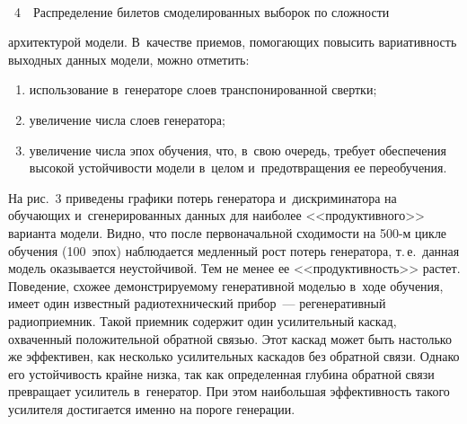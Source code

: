 \begin{multicols}{2}
\vspace*{6pt}

{ \begin{center}  %
 \vspace*{-3pt}
    \mbox{%
\epsfxsize=78.898mm 
}

\end{center}



\noindent
{{\figurename~4}\ \ \small{Распределение билетов смоделированных выборок по сложности
}}}

\vspace*{6pt}


 
 
 \noindent
  архитектурой модели. 
В~качестве приемов, помогающих повысить вариативность выходных 
данных модели, можно отметить:
  \begin{enumerate}[(1)]
\item использование в~генераторе слоев транспонированной свертки;
\item увеличение числа слоев генератора;
\item увеличение числа эпох обучения, что, в~свою очередь, требует 
обеспечения высокой устойчивости модели в~целом и~предотвращения ее 
переобучения.
\end{enumerate}

  На рис.~3 приведены графики потерь генератора и~дискриминатора на 
обучающих и~сгенерированных данных для наиболее <<продуктивного>> 
варианта модели. Видно, что после первоначальной сходимости на 
500-м цикле обуче\-ния (100~эпох) наблюдается медленный рост потерь 
генератора, т.\,е.\ данная модель оказывается неустойчивой. Тем не менее 
ее <<про\-дук\-тив\-ность>> растет. Поведение, схожее демонстрируемому 
генеративной моделью в~ходе обуче\-ния, имеет один известный 
радиотехнический прибор~--- регенеративный радиоприемник. Такой 
приемник содержит один усилительный каскад, охваченный положительной 
обратной связью. Этот каскад может быть настолько же эффективен, как 
несколько усилительных каскадов без обратной связи. Однако его 
устойчивость крайне низка, так как определенная глубина обратной связи 
превращает усилитель в~генератор. При этом наибольшая эффективность 
такого усилителя достигается именно на пороге генерации.
  
  
  

\end{multicols}
